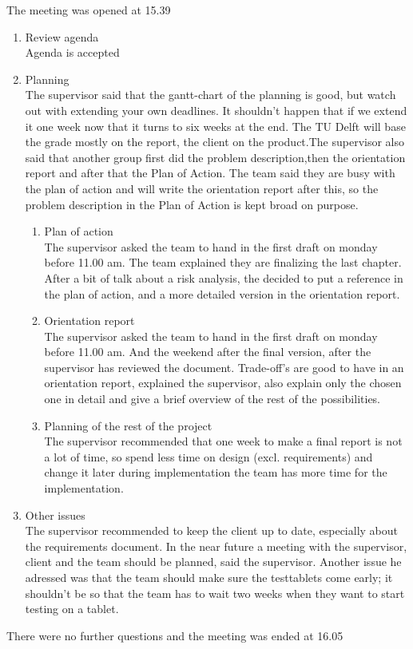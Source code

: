 \documentclass[pdftex, 12pt, a4paper]{report}
\begin{document}
\pagestyle{fancy}
\fancyhead[LE, LO] {\today}

The meeting was opened at 15.39

\begin{enumerate}
\item Review agenda\\		
Agenda is accepted
	
\item Planning\\
The supervisor said that the gantt-chart of the planning is good, but watch out with extending your own deadlines. It shouldn't happen that if we extend it one week now that it turns to six weeks at the end. The TU Delft will base the grade mostly on the report, the client on the product.The supervisor also said that another group first did the problem description,then the orientation report and after that the Plan of Action. The team said they are busy with the plan of action and will write the orientation report after this, so the problem description in the Plan of Action is kept broad on purpose.

\begin{enumerate}
\item Plan of action\\
The supervisor asked the team to hand in the first draft on monday before 11.00 am. The team explained they are finalizing the last chapter. After a bit of talk about a risk analysis, the decided to put a reference in the plan of action, and a more detailed version in the orientation report.

\item Orientation report\\
The supervisor asked the team to hand in the first draft on monday before 11.00 am. And the weekend after the final version, after the supervisor has reviewed the document. Trade-off's are good to have in an orientation report, explained the supervisor, also explain only the chosen one in detail and give a brief overview of the rest of the possibilities. 

\item Planning of the rest of the project \\
The supervisor recommended that one week to make a final report is not a lot of time, so spend less time on design (excl. requirements) and change it later during implementation the team has more time for the implementation.

\end{enumerate}
\item Other issues\\
The supervisor recommended to keep the client up to date, especially about the requirements document.
In the near future a meeting with the supervisor, client and the team should be planned, said the supervisor. Another issue he adressed was that the team should make sure the testtablets come early; it shouldn't be so that the team has to wait two weeks when they want to start testing on a tablet.

\end{enumerate}

There were no further questions and the meeting was ended at 16.05
\end{document}
